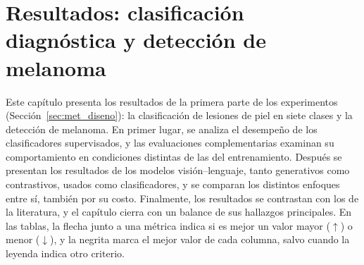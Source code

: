 \chapter[Resultados: clasificación y detección de melanoma]{Resultados: clasificación diagnóstica y detección de melanoma}
\label{cp:res_clasif}
%



Este capítulo presenta los resultados de la primera parte de los experimentos (Sección~\ref{sec:met_diseno}): la
clasificación de lesiones de piel en siete clases y la detección de melanoma. En primer lugar, se analiza el desempeño
de los clasificadores supervisados, y las evaluaciones complementarias examinan su comportamiento en condiciones
distintas de las del entrenamiento. Después se presentan los resultados de los modelos visión--lenguaje, tanto
generativos como contrastivos, usados como clasificadores, y se comparan los distintos enfoques entre sí, también por
su costo. Finalmente, los resultados se contrastan con los de la literatura, y el capítulo cierra con un balance de
sus hallazgos principales. En las tablas, la flecha junto a una métrica indica si es mejor un valor mayor
($\uparrow$) o menor ($\downarrow$), y la negrita marca el mejor valor de cada columna, salvo cuando la leyenda indica otro criterio.







